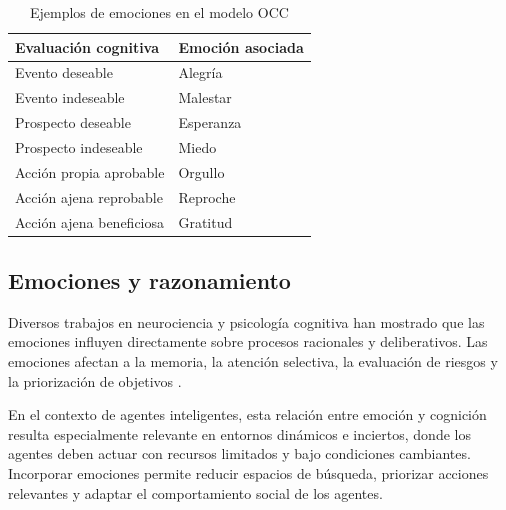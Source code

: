 \begin{table}[H]
\centering
\caption{Ejemplos de emociones en el modelo OCC}
\begin{tabular}{|l|l|}
\hline
\textbf{Evaluación cognitiva} & \textbf{Emoción asociada} \\ \hline
Evento deseable & Alegría \\ \hline
Evento indeseable & Malestar \\ \hline
Prospecto deseable & Esperanza \\ \hline
Prospecto indeseable & Miedo \\ \hline
Acción propia aprobable & Orgullo \\ \hline
Acción ajena reprobable & Reproche \\ \hline
Acción ajena beneficiosa & Gratitud \\ \hline
\end{tabular}
\label{tab:occ}
\end{table}

\subsection{Emociones y razonamiento}

Diversos trabajos en neurociencia y psicología cognitiva han mostrado que las emociones influyen directamente sobre procesos racionales y deliberativos. Las emociones afectan a la memoria, la atención selectiva, la evaluación de riesgos y la priorización de objetivos \cite{alfonso2021affect}.

En el contexto de agentes inteligentes, esta relación entre emoción y cognición resulta especialmente relevante en entornos dinámicos e inciertos, donde los agentes deben actuar con recursos limitados y bajo condiciones cambiantes. Incorporar emociones permite reducir espacios de búsqueda, priorizar acciones relevantes y adaptar el comportamiento social de los agentes.